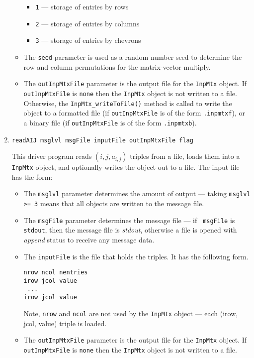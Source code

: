 \begin{enumerate}
\begin{itemize}
\begin{itemize}
\item {\tt 1} --- storage of entries by rows
\item {\tt 2} --- storage of entries by columns
\item {\tt 3} --- storage of entries by chevrons
\end{itemize}
\item
The {\tt seed} parameter is used as a random number seed to
determine the row and column permutations for the matrix-vector
multiply.
\item
The {\tt outInpMtxFile} parameter is the output file for the 
{\tt InpMtx} object. 
If {\tt outInpMtxFile} is {\tt none} then the {\tt InpMtx} object 
is not written to a file. 
Otherwise, the {\tt InpMtx\_writeToFile()} method is called to write
the object to 
a formatted file (if {\tt outInpMtxFile} 
is of the form {\tt *.inpmtxf}), or
a binary file (if {\tt outInpMtxFile} is of the form {\tt *.inpmtxb}).
\end{itemize}
\item
\begin{verbatim}
readAIJ msglvl msgFile inputFile outInpMtxFile flag
\end{verbatim}
This driver program reads $(i,j,a_{i,j})$ triples from a file,
loads them into a {\tt InpMtx} object,
and optionally writes the object out to a file.
The input file has the form:
\begin{itemize}
\item
The {\tt msglvl} parameter determines the amount of output ---
taking {\tt msglvl >= 3} means that all objects are written
to the message file.
\item
The {\tt msgFile} parameter determines the message file --- if {\tt
msgFile} is {\tt stdout}, then the message file is {\it stdout},
otherwise a file is opened with {\it append} status to receive any
message data.
\item
The {\tt inputFile} is the file that holds the triples.
It has the following form.
\begin{verbatim}
nrow ncol nentries
irow jcol value
 ...
irow jcol value
\end{verbatim}
Note, {\tt nrow} and {\tt ncol} are not used by the {\tt InpMtx}
object --- each (irow, jcol, value) triple is loaded.
\item
The {\tt outInpMtxFile} parameter is the output file for the 
{\tt InpMtx} object. 
If {\tt outInpMtxFile} is {\tt none} then the {\tt InpMtx} object 
is not written to a file. 

\end{itemize}
\end{enumerate}
